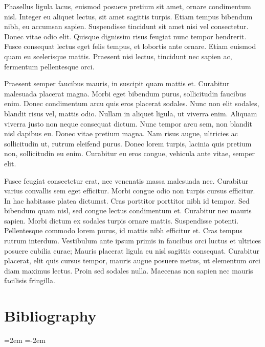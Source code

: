 \documentclass[
]{article}
\begin{document}
Phasellus ligula lacus, euismod posuere pretium sit amet, ornare condimentum nisl. Integer eu aliquet lectus, sit amet sagittis turpis. Etiam tempus bibendum nibh, eu accumsan sapien. Suspendisse tincidunt sit amet nisi vel consectetur. Donec vitae odio elit. Quisque dignissim risus feugiat nunc tempor hendrerit. Fusce consequat lectus eget felis tempus, et lobortis ante ornare. Etiam euismod quam eu scelerisque mattis. Praesent nisi lectus, tincidunt nec sapien ac, fermentum pellentesque orci.

Praesent semper faucibus mauris, in suscipit quam mattis et. Curabitur malesuada placerat magna. Morbi eget bibendum purus, sollicitudin faucibus enim. Donec condimentum arcu quis eros placerat sodales. Nunc non elit sodales, blandit risus vel, mattis odio. Nullam in aliquet ligula, ut viverra enim. Aliquam viverra justo non neque consequat dictum. Nunc tempor arcu sem, non blandit nisl dapibus eu. Donec vitae pretium magna. Nam risus augue, ultricies ac sollicitudin ut, rutrum eleifend purus. Donec lorem turpis, lacinia quis pretium non, sollicitudin eu enim. Curabitur eu eros congue, vehicula ante vitae, semper elit.

Fusce feugiat consectetur erat, nec venenatis massa malesuada nec. Curabitur varius convallis sem eget efficitur. Morbi congue odio non turpis cursus efficitur. In hac habitasse platea dictumst. Cras porttitor porttitor nibh id tempor. Sed bibendum quam nisl, sed congue lectus condimentum et. Curabitur nec mauris sapien. Morbi dictum ex sodales turpis ornare mattis. Suspendisse potenti. Pellentesque commodo lorem purus, id mattis nibh efficitur et. Cras tempus rutrum interdum. Vestibulum ante ipsum primis in faucibus orci luctus et ultrices posuere cubilia curae; Mauris placerat ligula eu nisl sagittis consequat. Curabitur placerat, elit quis cursus tempor, mauris augue posuere metus, ut elementum orci diam maximus lectus. Proin sed sodales nulla. Maecenas non sapien nec mauris facilisis fringilla.

\clearpage

\section*{Bibliography}

\noindent
\leftskip=2em
\parindent=-2em
\end{document}
